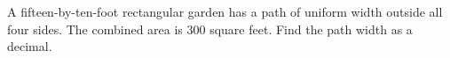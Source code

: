 A fifteen-by-ten-foot rectangular garden has a path of uniform width outside all four sides. The combined area is 300 square feet. Find the path width as a decimal.
